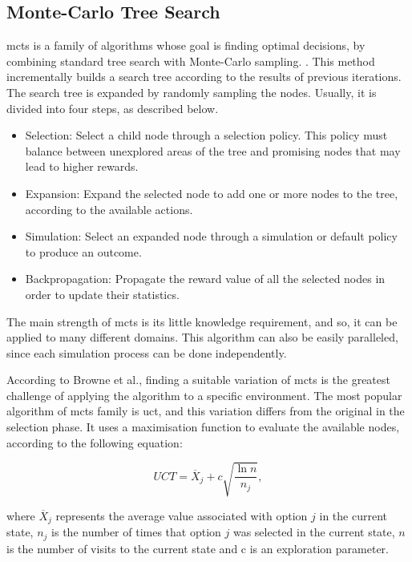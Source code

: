 \subsection{Monte-Carlo Tree Search}


\gls{mcts} is a family of algorithms whose goal is finding optimal decisions, by combining standard tree search with Monte-Carlo sampling. \cite{Browne2012}.
This method incrementally builds a search tree according to the results of previous iterations.
The search tree is expanded by randomly sampling the nodes.
Usually, it is divided into four steps, as described below.
\begin{itemize}
  \item Selection: Select a child node through a selection policy. This policy must balance between unexplored areas of the tree and promising nodes that may lead to higher rewards.
  \item Expansion: Expand the selected node to add one or more nodes to the tree, according to the available actions.
  \item Simulation: Select an expanded node through a simulation or default policy to produce an outcome.
  \item Backpropagation: Propagate the reward value of all the selected nodes in order to update their statistics.
\end{itemize}


The main strength of \gls{mcts} is its little knowledge requirement, and so, it can be applied to many different domains.
This algorithm can also be easily paralleled, since each simulation process can be done independently.


According to Browne et al., finding a suitable variation of \gls{mcts} is the greatest challenge of applying the algorithm to a specific environment.
The most popular algorithm of \gls{mcts} family is \gls{uct}, and this variation differs from the original in the selection phase.
It uses a maximisation function to evaluate the available nodes, according to the following equation:

\begin{equation}
    UCT = \overline{X}_j + c\sqrt{\frac{\ln n}{n_j}},
\end{equation}

where $\overline{X}_j$ represents the average value associated with option $j$ in the current state, $n_j$ is the number of times that option $j$ was selected in the current state, $n$ is the number of visits to the current state and c is an exploration parameter.

